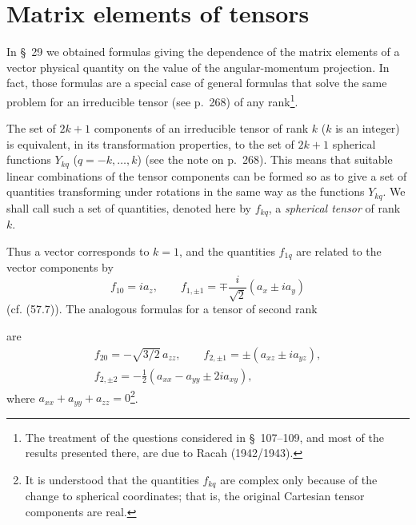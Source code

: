 \section{Matrix elements of tensors}

In \S~29 we obtained formulas giving the dependence of the matrix elements of a vector physical quantity on the value of the angular-momentum projection. In fact, those formulas are a special case of general formulas that solve the same problem for an irreducible tensor (see p.~268) of any rank\footnote{The treatment of the questions considered in \S~107--109, and most of the results presented there, are due to Racah (1942/1943).}.

The set of $2k+1$ components of an irreducible tensor of rank $k$ ($k$ is an integer) is equivalent, in its transformation properties, to the set of $2k+1$ spherical functions $Y_{kq}$ ($q=-k,\ldots,k$) (see the note on p.~268). This means that suitable linear combinations of the tensor components can be formed so as to give a set of quantities transforming under rotations in the same way as the functions $Y_{kq}$. We shall call such a set of quantities, denoted here by $f_{kq}$, a \emph{spherical tensor} of rank $k$.

Thus a vector corresponds to $k=1$, and the quantities $f_{1q}$ are related to the vector components by
\begin{equation}
 f_{10}=ia_z,\qquad f_{1,\pm1}=\mp\frac{i}{\sqrt2}(a_x\pm ia_y)
 \tag{107.1}
\end{equation}
(cf. (57.7)). The analogous formulas for a tensor of second rank

are
\begin{equation}
 \begin{gathered}
 f_{20}=-\sqrt{3/2}\,a_{zz},\qquad f_{2,\pm1}=\pm(a_{xz}\pm ia_{yz}),\\
 f_{2,\pm2}=-\frac12(a_{xx}-a_{yy}\pm2ia_{xy}),
 \end{gathered}
 \tag{107.2}
\end{equation}
where $a_{xx}+a_{yy}+a_{zz}=0$\footnote{It is understood that the quantities $f_{kq}$ are complex only because of the change to spherical coordinates; that is, the original Cartesian tensor components are real.}.

